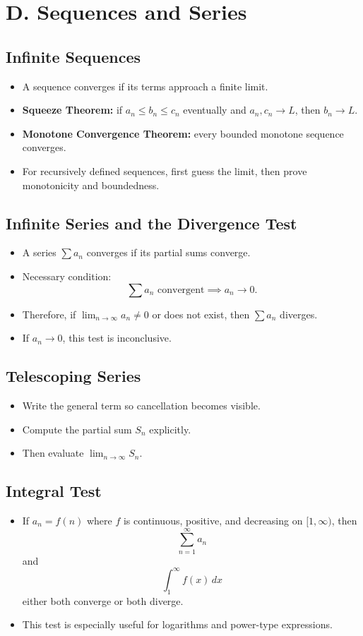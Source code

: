 \documentclass[11pt]{article}
\begin{document}
\section{D. Sequences and Series}

\subsection{Infinite Sequences}
\begin{itemize}
  \item A sequence converges if its terms approach a finite limit.
  \item \textbf{Squeeze Theorem:} if $a_n\le b_n\le c_n$ eventually and $a_n,c_n\to L$, then $b_n\to L$.
  \item \textbf{Monotone Convergence Theorem:} every bounded monotone sequence converges.
  \item For recursively defined sequences, first guess the limit, then prove monotonicity and boundedness.
\end{itemize}

\subsection{Infinite Series and the Divergence Test}
\begin{itemize}
  \item A series $\sum a_n$ converges if its partial sums converge.
  \item Necessary condition:
  \[
  \sum a_n \text{ convergent} \implies a_n\to 0.
  \]
  \item Therefore, if $\lim_{n\to\infty} a_n\neq 0$ or does not exist, then $\sum a_n$ diverges.
  \item If $a_n\to 0$, this test is inconclusive.
\end{itemize}

\subsection{Telescoping Series}
\begin{itemize}
  \item Write the general term so cancellation becomes visible.
  \item Compute the partial sum $S_n$ explicitly.
  \item Then evaluate $\lim_{n\to\infty} S_n$.
\end{itemize}

\subsection{Integral Test}
\begin{itemize}
  \item If $a_n=f(n)$ where $f$ is continuous, positive, and decreasing on $[1,\infty)$, then
  \[
  \sum_{n=1}^\infty a_n
  \]
  and
  \[
  \int_1^\infty f(x)\,dx
  \]
  either both converge or both diverge.
  \item This test is especially useful for logarithms and power-type expressions.
\end{itemize}
\end{document}
